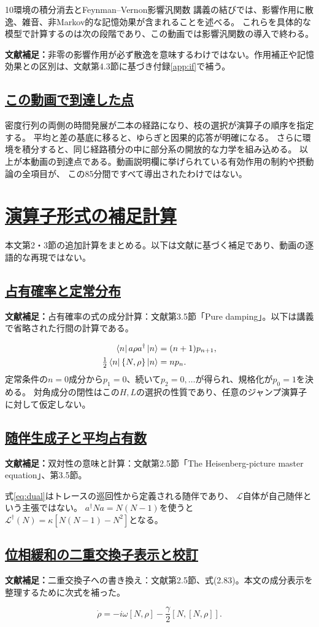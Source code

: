 \documentclass[a4paper,11pt]{ltjsarticle}
\newcommand{\sectionlink}[1]{\section[#1]{\hyperlink{toc}{#1}}}
\newcommand{\subsectionlink}[1]{\subsection[#1]{\hyperlink{toc}{#1}}}
\numberwithin{equation}{section}
\newcommand{\supplement}[1]{\par\medskip\noindent\textcolor{notered}{\textbf{文献補足：}}#1\par\smallskip}
\begin{document}
\begin{lecturesection}{10}{環境の積分消去とFeynman--Vernon影響汎関数}
講義の結びでは、影響作用に散逸、雑音、非Markov的な記憶効果が含まれることを述べる。
これらを具体的な模型で計算するのは次の段階であり、この動画では影響汎関数の導入で終わる。

\supplement{非零の影響作用が必ず散逸を意味するわけではない。作用補正や記憶効果との区別は、文献\cite{Pajer:2026fuo}第4.3節に基づき付録\ref{app:if}で補う。}

\subsectionlink{この動画で到達した点}
密度行列の両側の時間発展が二本の経路になり、枝の選択が演算子の順序を指定する。
平均と差の基底に移ると、ゆらぎと因果的応答が明確になる。
さらに環境を積分すると、同じ経路積分の中に部分系の開放的な力学を組み込める。
以上が本動画の到達点である。動画説明欄に挙げられている有効作用の制約や摂動論の全項目が、
この85分間ですべて導出されたわけではない。
\end{lecturesection}


\appendix
\renewcommand{\theequation}{\Alph{section}.\arabic{equation}}

\sectionlink{演算子形式の補足計算}
\label{app:operator}
本文第2・3節の追加計算をまとめる。以下は文献に基づく補足であり、動画の逐語的な再現ではない。

\subsectionlink{占有確率と定常分布}
\label{app:pop}
\supplement{占有確率の式の成分計算：文献\cite{Pajer:2026fuo}第3.5節「Pure damping」。以下は講義で省略された行間の計算である。}
\begin{align}
 \bra n a\rho a^\dagger\ket n&=(n+1)p_{n+1},\\
 \tfrac12\bra n\{N,\rho\}\ket n&=np_n.
\end{align}
定常条件の$n=0$成分から$p_1=0$、続いて$p_2=0,\ldots$が得られ、規格化が$p_0=1$を決める。
対角成分の閉性はこの$H,L$の選択の性質であり、任意のジャンプ演算子に対して仮定しない。

\subsectionlink{随伴生成子と平均占有数}
\label{app:dual}
\supplement{双対性の意味と計算：文献\cite{Pajer:2026fuo}第2.5節「The Heisenberg-picture master equation」、第3.5節。}
式\eqref{eq:dual}はトレースの巡回性から定義される随伴であり、
$\mathcal L$自体が自己随伴という主張ではない。
$a^\dagger Na=N(N-1)$を使うと$\mathcal L^\dagger(N)=\kappa[N(N-1)-N^2]$となる。

\subsectionlink{位相緩和の二重交換子表示と校訂}
\label{app:dephase}
\supplement{二重交換子への書き換え：文献\cite{Pajer:2026fuo}第2.5節、式(2.83)。本文の成分表示を整理するために次式を補った。}
\begin{equation}
 \dot\rho=-i\omega[N,\rho]-\frac\gamma2[N,[N,\rho]].
\end{equation}
\end{document}
